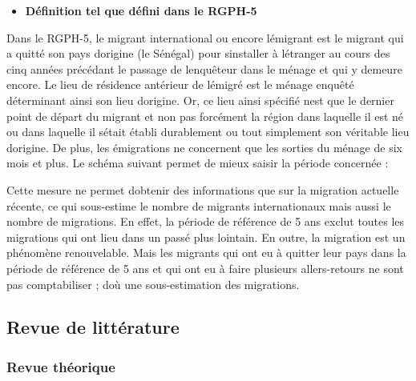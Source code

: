 \documentclass[
  letterpaper,
  DIV=11,
  numbers=noendperiod]{scrartcl}
\providecommand{\tightlist}{%
  \setlength{\itemsep}{0pt}\setlength{\parskip}{0pt}}\usepackage{longtable,booktabs,array}
\begin{document}
\begin{itemize}
\tightlist
\item
  \textbf{Définition tel que défini dans le RGPH-5}
\end{itemize}

Dans le RGPH-5, le migrant international ou encore
l\textquotesingle émigrant est le migrant qui a quitté son pays
d\textquotesingle origine (le Sénégal) pour s\textquotesingle installer
à l\textquotesingle étranger au cours des cinq années précédant le
passage de l\textquotesingle enquêteur dans le ménage et qui y demeure
encore. Le lieu de résidence antérieur de l\textquotesingle émigré est
le ménage enquêté déterminant ainsi son lieu d\textquotesingle origine.
Or, ce lieu ainsi spécifié n\textquotesingle est que le dernier point de
départ du migrant et non pas forcément la région dans laquelle il est né
ou dans laquelle il s\textquotesingle était établi durablement ou tout
simplement son véritable lieu d\textquotesingle origine. De plus, les
émigrations ne concernent que les sorties du ménage de six mois et plus.
Le schéma suivant permet de mieux saisir la période concernée :

Cette mesure ne permet d\textquotesingle obtenir des informations que
sur la migration actuelle récente, ce qui sous-estime le nombre de
migrants internationaux mais aussi le nombre de migrations. En effet, la
période de référence de 5 ans exclut toutes les migrations qui ont lieu
dans un passé plus lointain. En outre, la migration est un phénomène
renouvelable. Mais les migrants qui ont eu à quitter leur pays dans la
période de référence de 5 ans et qui ont eu à faire plusieurs
allers-retours ne sont pas comptabiliser ; d\textquotesingle où une
sous-estimation des migrations.

\hypertarget{revue-de-littuxe9rature}{%
\subsection{Revue de littérature}\label{revue-de-littuxe9rature}}

\hypertarget{revue-thuxe9orique}{%
\subsubsection{Revue théorique}\label{revue-thuxe9orique}}
\end{document}
